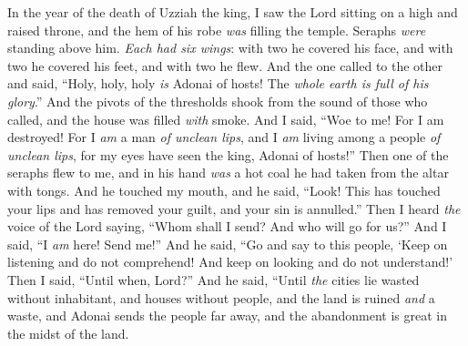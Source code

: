 \begin{biblechapter} %
 In the year of the death of Uzziah the king, I saw the Lord sitting on a high and raised throne, and the hem of his robe \textit{was} filling the temple.
\verse Seraphs \textit{were} standing above him. \textit{Each had six wings}: with two he covered his face, and with two he covered his feet, and with two he flew.
\verse And the one called to the other and said, “Holy, holy, holy \textit{is} Adonai of hosts! 
The \textit{whole earth is full of his glory}.”
\verse And the pivots of the thresholds shook from the sound of those who called, and the house was filled \textit{with} smoke.
\verse And I said, “Woe to me! For I am destroyed! For I \textit{am} a man \textit{of unclean lips}, and I \textit{am} living among a people \textit{of unclean lips}, for my eyes have seen the king, Adonai of hosts!”
\verse Then one of the seraphs flew to me, and in his hand \textit{was} a hot coal he had taken from the altar with tongs.
\verse And he touched my mouth, and he said, “Look! This has touched your lips 
and has removed your guilt, 
and your sin is annulled.”
\verse Then I heard \textit{the} voice of the Lord saying, “Whom shall I send? 
And who will go for us?” And I said, “I \textit{am} here! 
Send me!”
\verse And he said, “Go and say to this people,
\verse ‘Keep on listening and do not comprehend! 
And keep on looking and do not understand!’
\verse Then I said, “Until when, Lord?” And he said,
\verse “Until \textit{the} cities lie wasted without inhabitant, 
and houses without people, 
and the land is ruined \textit{and} a waste,
\verse and Adonai sends the people far away, 
and the abandonment is great in the midst of the land.
\end{biblechapter}

